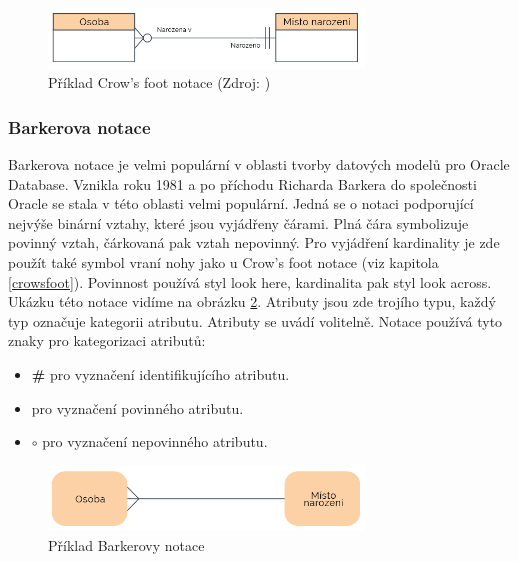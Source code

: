 \documentclass[czech,bachelor,public,dept460,male,oneside]{diploma}
\begin{document}
		\begin{figure}[!h]
			\centering
			\includegraphics[width=0.75\textwidth]{Figures/NotationExCrow}
			\caption[Příklad Crow's foot notace]{Příklad Crow's foot notace (Zdroj: \cite{whatIsERD})}
			\label{fig:notationExCrow}
		\end{figure}
		
		\subsubsection{Barkerova notace} \label{barker}
		Barkerova notace \cite{compErNotations} je velmi populární v oblasti tvorby datových modelů pro Oracle Database. Vznikla roku 1981 a po příchodu Richarda Barkera do společnosti Oracle se stala v této oblasti velmi populární. Jedná se o notaci podporující nejvýše binární vztahy, které jsou vyjádřeny čárami. Plná čára symbolizuje povinný vztah, čárkovaná pak vztah nepovinný. Pro vyjádření kardinality je zde použít také symbol vraní nohy jako u Crow's foot notace (viz kapitola \ref{crowsfoot}). Povinnost používá styl look here, kardinalita pak styl look across. Ukázku této notace vidíme na obrázku \ref{fig:notationExBarker}. Atributy jsou zde trojího typu, každý typ označuje kategorii atributu. Atributy se uvádí volitelně. Notace používá tyto znaky pro kategorizaci atributů:
		
		\begin{itemize}
			\item \textbf{\#} pro vyznačení identifikujícího atributu.
			\item \textbf{\textasteriskcentered} pro vyznačení povinného atributu.
			\item \textbf{$\circ$} pro vyznačení nepovinného atributu.
		\end{itemize}
	
		\begin{figure}[!h]
			\centering
			\includegraphics[width=0.75\textwidth]{Figures/NotationExBarker}
			\caption[Příklad Barkerovy notace]{Příklad Barkerovy notace \cite{whatIsERD}}
			\label{fig:notationExBarker}
		\end{figure}
	
\end{document}
